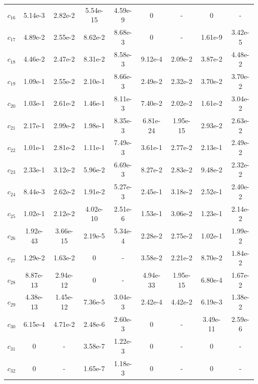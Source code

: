 \begin{table}[p]
{\begin{tabular}{lcc@{\hspace{16pt}}cc@{\hspace{16pt}}cc@{\hspace{16pt}}cc}
$c_{16}$ & 5.14e-3 & 2.82e-2 & 5.54e-15 & 4.59e-9 & 0 & - & 0 & - \\
$c_{17}$ & 4.89e-2 & 2.55e-2 & 8.62e-2 & 8.68e-3 & 0 & - & 1.61e-9 & 3.42e-5 \\
$c_{18}$ & 4.46e-2 & 2.47e-2 & 8.31e-2 & 8.58e-3 & 9.12e-4 & 2.09e-2 & 3.87e-2 & 4.48e-2 \\
$c_{19}$ & 1.09e-1 & 2.55e-2 & 2.10e-1 & 8.66e-3 & 2.49e-2 & 2.32e-2 & 3.70e-2 & 3.70e-2 \\
$c_{20}$ & 1.03e-1 & 2.61e-2 & 1.46e-1 & 8.11e-3 & 7.40e-2 & 2.02e-2 & 1.61e-2 & 3.04e-2 \\
$c_{21}$ & 2.17e-1 & 2.99e-2 & 1.98e-1 & 8.35e-3 & 6.81e-24 & 1.95e-15 & 2.93e-2 & 2.63e-2 \\
$c_{22}$ & 1.01e-1 & 2.81e-2 & 1.11e-1 & 7.49e-3 & 3.61e-1 & 2.77e-2 & 2.13e-1 & 2.49e-2 \\
$c_{23}$ & 2.33e-1 & 3.12e-2 & 5.96e-2 & 6.69e-3 & 8.27e-2 & 2.83e-2 & 9.48e-2 & 2.32e-2 \\
$c_{24}$ & 8.44e-3 & 2.62e-2 & 1.91e-2 & 5.27e-3 & 2.45e-1 & 3.18e-2 & 2.52e-1 & 2.40e-2 \\
$c_{25}$ & 1.02e-1 & 2.12e-2 & 4.02e-10 & 2.51e-6 & 1.53e-1 & 3.06e-2 & 1.23e-1 & 2.14e-2 \\
$c_{26}$ & 1.92e-43 & 3.66e-15 & 2.19e-5 & 5.34e-4 & 2.28e-2 & 2.75e-2 & 1.02e-1 & 1.99e-2 \\
$c_{27}$ & 1.29e-2 & 1.63e-2 & 0 & - & 3.58e-2 & 2.21e-2 & 8.70e-2 & 1.84e-2 \\
$c_{28}$ & 8.87e-13 & 2.94e-12 & 0 & - & 4.94e-33 & 1.95e-15 & 6.80e-4 & 1.67e-2 \\
$c_{29}$ & 4.38e-13 & 1.45e-12 & 7.36e-5 & 3.04e-3 & 2.42e-4 & 4.42e-2 & 6.19e-3 & 1.38e-2 \\
$c_{30}$ & 6.15e-4 & 4.71e-2 & 2.48e-6 & 2.60e-3 & 0 & - & 3.49e-11 & 2.59e-6 \\
$c_{31}$ & 0 & - & 3.58e-7 & 1.22e-3 & 0 & - & 0 & - \\
$c_{32}$ & 0 & - & 1.65e-7 & 1.18e-3 & 0 & - & 0 & - \\
\bottomrule
\end{tabular}}
\endgroup
\end{table}
\clearpage
